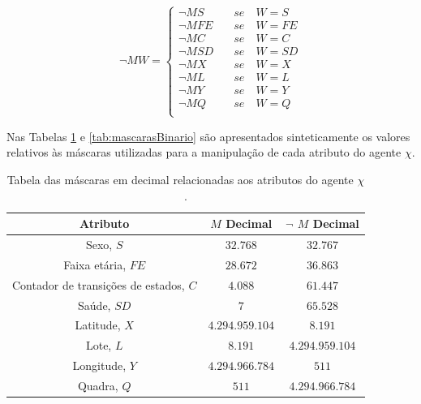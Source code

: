 \begin{equation}
\neg MW= 
 \begin{cases}
 \neg MS  \quad &se \quad W=S  \\
 \neg MFE \quad &se \quad W=FE \\
 \neg MC  \quad &se \quad W=C  \\
 \neg MSD \quad &se \quad W=SD \\ 
 
 \neg MX  \quad &se \quad W=X  \\
 \neg ML  \quad &se \quad W=L  \\
 
 \neg MY  \quad &se \quad W=Y  \\
 \neg MQ  \quad &se \quad W=Q  \\
 \end{cases}
 \label{eq:mascarasNegativas_2}
\end{equation}

Nas Tabelas \ref{tab:mascarasDecimal} e \ref{tab:mascarasBinario} são apresentados sinteticamente os valores relativos às máscaras utilizadas para a manipulação de cada atributo do agente $\chi$.
\begin{table}[H]
\centering
\begin{tabular}{c|c|c}
 \textbf{Atributo} 				& \textbf{$M$ Decimal}	& \textbf{$\neg$ $M$ Decimal} 	\\ \hline
 Sexo, $S$ 					& $32.768$		& $32.767$  			\\
 Faixa etária, $FE$ 				& $28.672$		& $36.863$   			\\
 Contador de transições de estados, $C$ 	& $4.088$		& $61.447$  			\\
 Saúde, $SD$					& $7$			& $65.528$  			\\ 
 
 Latitude, $X$		 			& $4.294.959.104$	& $8.191$  			\\
 Lote, $L$ 					& $8.191$		& $4.294.959.104$  		\\
 
 Longitude, $Y$ 				& $4.294.966.784$	& $511$				\\ 
 Quadra, $Q$ 					& $511$			& $4.294.966.784$   		\\
\end{tabular}
\caption{Tabela das máscaras em decimal relacionadas aos atributos do agente $\chi$.}
\label{tab:mascarasDecimal}
\end{table}


